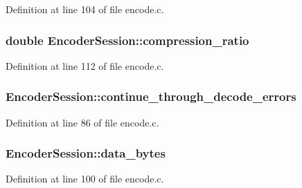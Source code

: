 Definition at line 104 of file encode.\+c.

\subsubsection[{\texorpdfstring{compression\+\_\+ratio}{compression_ratio}}]{\setlength{\rightskip}{0pt plus 5cm}double Encoder\+Session\+::compression\+\_\+ratio}\hypertarget{struct_encoder_session_a3925c96b3ca8629ec49a2ed149054ca7}{}\label{struct_encoder_session_a3925c96b3ca8629ec49a2ed149054ca7}


Definition at line 112 of file encode.\+c.

\subsubsection[{\texorpdfstring{continue\+\_\+through\+\_\+decode\+\_\+errors}{continue_through_decode_errors}}]{ Encoder\+Session\+::continue\+\_\+through\+\_\+decode\+\_\+errors}\hypertarget{struct_encoder_session_a7d8744a6e81388bbd90e3610487ef9d6}{}\label{struct_encoder_session_a7d8744a6e81388bbd90e3610487ef9d6}


Definition at line 86 of file encode.\+c.

\subsubsection[{\texorpdfstring{data\+\_\+bytes}{data_bytes}}]{ Encoder\+Session\+::data\+\_\+bytes}\hypertarget{struct_encoder_session_a9cdd63bbaf3ee8091ebd6c623371fbf3}{}\label{struct_encoder_session_a9cdd63bbaf3ee8091ebd6c623371fbf3}


Definition at line 100 of file encode.\+c.

